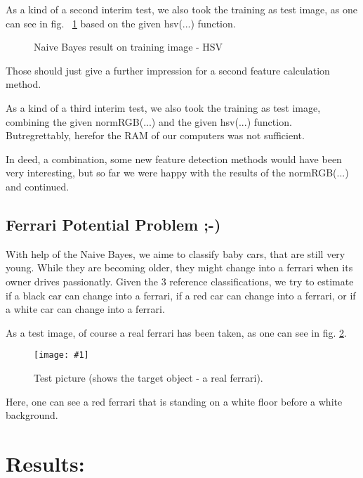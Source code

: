 \documentclass[a4paper,headings=small]{scrartcl}
\numberwithin{equation}{section} %
\numberwithin{figure}{section}   %
\newcommand{\image}[3]{
	\begin{figure}[htbp]
		\centering
		\texttt{[image: \#1]}
		\caption{#3}
		\label{fig:#1}
	\end{figure}
}
\newcommand{\generatedImgRoot}{../resources/img}
\newcommand{\generatedImgRootTwo}{../../../target}
\begin{document}
As a kind of a second interim test, we also took the training as test image,
as one can see in fig. ~\ref{fig:label6} based on the given hsv(...) function.

\begin{figure}
\hfill
{}
\caption{Naive Bayes result on training image - HSV}
\label{fig:label6}
\end{figure}

Those should just give a further impression for a second feature calculation method.

As a kind of a third interim test, we also took the training as test image, 
combining the given normRGB(...) and the given hsv(...) function.
Butregrettably, herefor the RAM of our computers was not sufficient.

In deed, a combination, some new feature detection methods would have been very interesting,
but so far we were happy with the results of the normRGB(...) and continued.

\subsection{Ferrari Potential Problem ;-)}
With help of the Naive Bayes, we aime to classify baby cars, that are still very young.
While they are becoming older, they might change into a ferrari when its owner drives passionatly.
Given the 3 reference classifications, we try to estimate if a black car can change into a ferrari,
if a red car can change into a ferrari, or if a white car can change into a ferrari.

As a test image, of course a real ferrari has been taken, 
as one can see in fig. \ref{fig:\generatedImgRoot/test_image1.jpeg}.

\image{\generatedImgRoot/test_image1.jpeg}{0.8}{%
		Test picture (shows the target object - a real ferrari).}

Here, one can see a red ferrari that is standing on a white floor before a white background.

\section{Results:}
\end{document}
